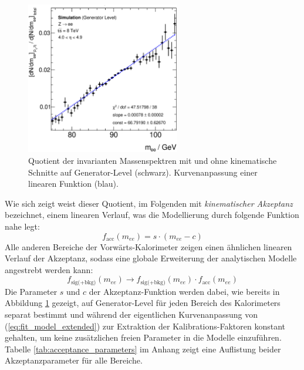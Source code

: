 \begin{figure}
    \centering
    \includegraphics[width=0.6\textwidth]{plots/efficiency_p40}
    \caption[Quotient der invarianten Massenspektren mit und ohne kinematische
        Schnitte auf Generator-Level]
        {Quotient der invarianten Massenspektren mit und ohne kinematische
        Schnitte auf Generator-Level (schwarz). Kurvenanpassung einer linearen
        Funktion (blau).}
    \label{fig:efficiency_p40}
\end{figure}

Wie sich zeigt weist dieser Quotient, im Folgenden mit \textit{kinematischer
Akzeptanz} bezeichnet, einem linearen Verlauf, was die Modellierung durch
folgende Funktion nahe legt:
\begin{equation}
    f_\text{acc}(m_{ee}) = s \cdot (m_{ee}-c)
    \label{eq:acceptance}
\end{equation}
Alle anderen Bereiche der Vorwärts-Kalorimeter zeigen einen ähnlichen linearen
Verlauf der Akzeptanz, sodass eine globale Erweiterung der analytischen Modelle
angestrebt werden kann:
\begin{equation}
    f_\text{sig(+bkg)}(m_{ee}) \longrightarrow f_\text{sig(+bkg)}(m_{ee})
    \cdot f_\text{acc}(m_{ee})
    \label{eq:fit_model_extended}
\end{equation}
Die Parameter $s$ und $c$ der Akzeptanz-Funktion werden dabei, wie bereits in
Abbildung \ref{fig:efficiency_p40} gezeigt, auf Generator-Level für jeden
Bereich des Kalorimeters separat bestimmt und während der eigentlichen
Kurvenanpassung von (\ref{eq:fit_model_extended}) zur Extraktion der
Kalibrations-Faktoren konstant gehalten, um keine zusätzlichen freien Parameter
in die Modelle einzuführen. Tabelle \ref{tab:acceptance_parameters} im Anhang
zeigt eine Auflistung beider Akzeptanzparameter für alle Bereiche.





